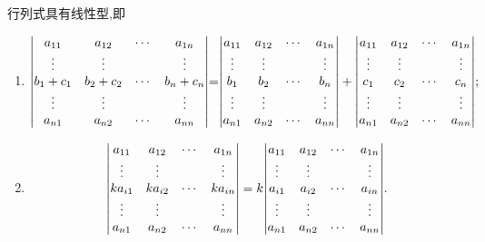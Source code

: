 \documentclass[9pt,a4paper]{book}
\begin{document}
\begin{feature}
	行列式具有线性型,即
	\begin{enumerate}
		\item\[ {\begin{vmatrix}
			{{a_{11}}}&{{a_{12}}}& \cdots &{{a_{1n}}}\\
			\vdots & \vdots &{\rm{ }}& \vdots \\
			{{b_1} + {c_1}}&{{b_2} + {c_2}}& \cdots &{{b_n} + {c_n}}\\
			\vdots & \vdots &{\rm{ }}& \vdots \\
			{{a_{n1}}}&{{a_{n2}}}& \cdots &{{a_{nn}}}
			\end{vmatrix}}{\rm{ = }} {\begin{vmatrix}
			{{a_{11}}}&{{a_{12}}}& \cdots &{{a_{1n}}}\\
			\vdots & \vdots &{\rm{ }}& \vdots \\
			{{b_1}}&{{b_2}}& \cdots &{{b_n}}\\
			\vdots & \vdots &{\rm{ }}& \vdots \\
			{{a_{n1}}}&{{a_{n2}}}& \cdots &{{a_{nn}}}
			\end{vmatrix}}  +  {\begin{vmatrix}
			{{a_{11}}}&{{a_{12}}}& \cdots &{{a_{1n}}}\\
			\vdots & \vdots &{\rm{ }}& \vdots \\
			{{c_1}}&{{c_2}}& \cdots &{{c_n}}\\
			\vdots & \vdots &{\rm{ }}& \vdots \\
			{{a_{n1}}}&{{a_{n2}}}& \cdots &{{a_{nn}}}
			\end{vmatrix}} ;\] 
		\item\[ {\begin{vmatrix}
			{{a_{11}}}&{{a_{12}}}& \cdots &{{a_{1n}}}\\
			\vdots & \vdots &{\rm{ }}& \vdots \\
			{k{a_{i1}}}&{k{a_{i2}}}& \cdots &{k{a_{in}}}\\
			\vdots & \vdots &{\rm{ }}& \vdots \\
			{{a_{n1}}}&{{a_{n2}}}& \cdots &{{a_{nn}}}
			\end{vmatrix}}  = k {\begin{vmatrix}
			{{a_{11}}}&{{a_{12}}}& \cdots &{{a_{1n}}}\\
			\vdots & \vdots &{\rm{ }}& \vdots \\
			{{a_{i1}}}&{{a_{i2}}}& \cdots &{{a_{in}}}\\
			\vdots & \vdots &{\rm{ }}& \vdots \\
			{{a_{n1}}}&{{a_{n2}}}& \cdots &{{a_{nn}}}
			\end{vmatrix}} .\]
	\end{enumerate}
\end{feature}
\end{document}
